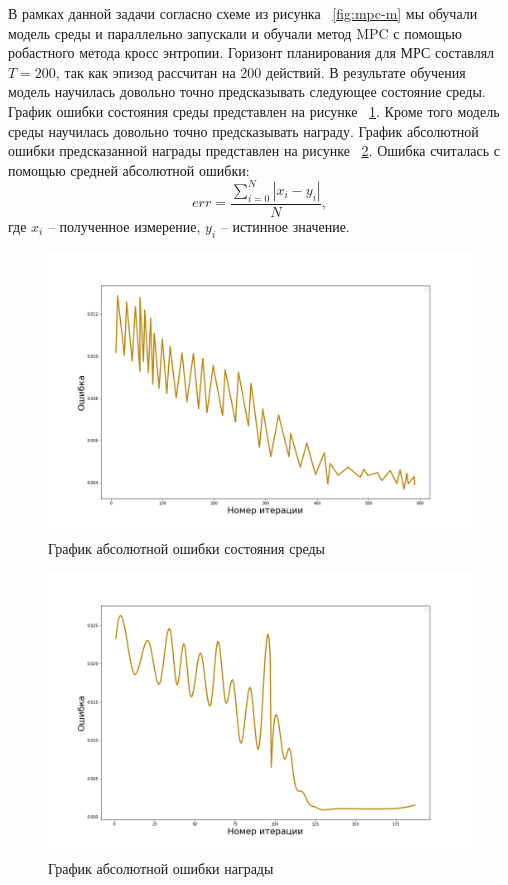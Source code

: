 В рамках данной задачи согласно схеме из рисунка ~\ref{fig:mpc-m} мы обучали модель среды и параллельно запускали и обучали метод MPC с помощью робастного метода кросс энтропии. Горизонт планирования для МРС  составлял $T=200$, так как эпизод рассчитан на 200 действий. В результате обучения модель научилась довольно точно предсказывать следующее состояние среды. График ошибки состояния среды представлен на рисунке ~\ref{fig:obs}. Кроме того модель среды научилась довольно точно предсказывать награду. График абсолютной ошибки предсказанной награды представлен на рисунке ~\ref{fig:rew-err}. Ошибка считалась с помощью средней абсолютной ошибки:
\begin{equation}
	err = \dfrac{\sum\limits_{i=0}^N |x_i - y_i|}{N},
	\label{eq:err}
\end{equation}
где $x_i$ -- полученное измерение, $y_i$ -- истинное значение.
\begin{figure}[!htb]
	\centering
	\includegraphics[scale=0.44]{obs.png}
	\caption {График абсолютной ошибки состояния среды}
	\label{fig:obs}
\end{figure}



\begin{figure}[!htb]
	\centering
	\includegraphics[scale=0.44]{rew_err.png}
	\caption {График абсолютной ошибки награды}
	\label{fig:rew-err}
\end{figure}

